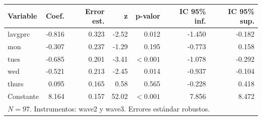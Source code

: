 
\begin{tabular}{lrrrrrr}
\toprule
Variable & Coef. & Error est. & z & p-valor & IC 95\% inf. & IC 95\% sup.\\
\midrule
lavgprc & -0.816 & 0.323 & -2.52 & 0.012 & -1.450 & -0.182\\
mon & -0.307 & 0.237 & -1.29 & 0.195 & -0.773 & 0.158\\
tues & -0.685 & 0.201 & -3.41 & $<0.001$ & -1.078 & -0.292\\
wed & -0.521 & 0.213 & -2.45 & 0.014 & -0.937 & -0.104\\
thurs & 0.095 & 0.165 & 0.58 & 0.565 & -0.228 & 0.418\\
Constante & 8.164 & 0.157 & 52.02 & $<0.001$ & 7.856 & 8.472\\
\midrule
\multicolumn{7}{l}{$N=97$. Instrumentos: wave2 y wave3. Errores estándar robustos.}\\
\bottomrule
\end{tabular}
